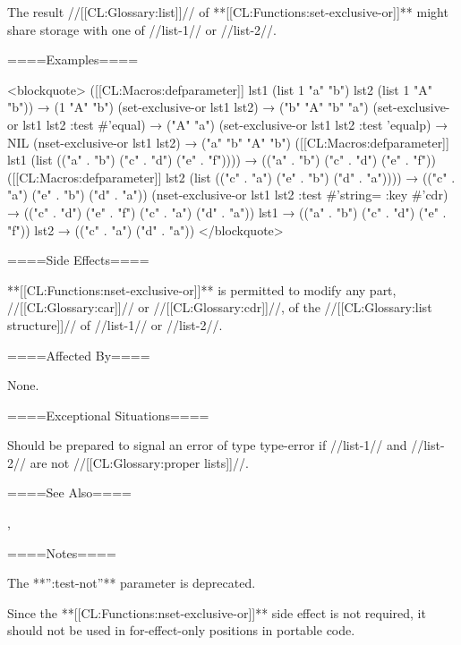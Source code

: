 The result //[[CL:Glossary:list]]// of **[[CL:Functions:set-exclusive-or]]** might share storage with one of //list-1// or //list-2//.

====Examples====

<blockquote> ([[CL:Macros:defparameter]] lst1 (list 1 "a" "b") lst2 (list 1 "A" "b")) → (1 "A" "b") (set-exclusive-or lst1 lst2) → ("b" "A" "b" "a") (set-exclusive-or lst1 lst2 :test #'equal) → ("A" "a") (set-exclusive-or lst1 lst2 :test 'equalp) → NIL (nset-exclusive-or lst1 lst2) → ("a" "b" "A" "b") ([[CL:Macros:defparameter]] lst1 (list (("a" . "b") ("c" . "d") ("e" . "f")))) → (("a" . "b") ("c" . "d") ("e" . "f")) ([[CL:Macros:defparameter]] lst2 (list (("c" . "a") ("e" . "b") ("d" . "a")))) → (("c" . "a") ("e" . "b") ("d" . "a")) (nset-exclusive-or lst1 lst2 :test #'string= :key #'cdr) → (("c" . "d") ("e" . "f") ("c" . "a") ("d" . "a")) lst1 → (("a" . "b") ("c" . "d") ("e" . "f")) lst2 → (("c" . "a") ("d" . "a")) </blockquote>

====Side Effects====

**[[CL:Functions:nset-exclusive-or]]** is permitted to modify any part, //[[CL:Glossary:car]]// or //[[CL:Glossary:cdr]]//, of the //[[CL:Glossary:list structure]]// of //list-1// or //list-2//.

====Affected By====

None.

====Exceptional Situations====

Should be prepared to signal an error of type type-error if //list-1// and //list-2// are not //[[CL:Glossary:proper lists]]//.

====See Also====

{\secref\ConstantModification},

{\secref\TraversalRules}

====Notes====

The **'':test-not''** parameter is deprecated.

Since the **[[CL:Functions:nset-exclusive-or]]** side effect is not required, it should not be used in for-effect-only positions in portable code.


    
